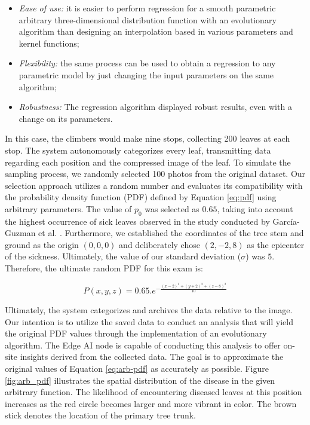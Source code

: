 \begin{itemize}
    \item \textit{Ease of use:} it is easier to perform regression for a smooth parametric arbitrary three-dimensional distribution function with an evolutionary algorithm than designing an interpolation based in various parameters and kernel functions;
    \item \textit{Flexibility:} the same process can be used to obtain a regression to any parametric model by just changing the input parameters on the same algorithm;
    \item \textit{Robustness:} The regression algorithm displayed robust results, even with a change on its parameters.
\end{itemize}

In this case, the climbers would make nine stops, collecting 200 leaves at each stop. The system autonomously categorizes every leaf, transmitting data regarding each position and the compressed image of the leaf. To simulate the sampling process, we randomly selected 100 photos from the original dataset. Our selection approach utilizes a random number and evaluates its compatibility with the probability density function (PDF) defined by Equation \ref{eq:pdf} using arbitrary parameters. The value of $p_0$ was selected as $0.65$, taking into account the highest occurrence of sick leaves observed in the study conducted by García-Guzman et al. \cite{garcia2004incidence}. Furthermore, we established the coordinates of the tree stem and ground as the origin $(0,0,0)$ and deliberately chose $(2,-2,8)$ as the epicenter of the sickness. Ultimately, the value of our standard deviation ($\sigma$) was $5$. Therefore, the ultimate random PDF for this exam is:

\begin{equation}
\label{eq:arb-pdf}
    P(x,y,z) = 0.65 . e^{-\frac{(x-2)^2 + (y+2)^2 + (z-8)^2}{10}}
\end{equation}

Ultimately, the system categorizes and archives the data relative to the image. Our intention is to utilize the saved data to conduct an analysis that will yield the original PDF values through the implementation of an evolutionary algorithm. The Edge AI node is capable of conducting this analysis to offer on-site insights derived from the collected data. The goal is to approximate the original values of Equation \ref{eq:arb-pdf} as accurately as possible. Figure \ref{fig:arb_pdf} illustrates the spatial distribution of the disease in the given arbitrary function. The likelihood of encountering diseased leaves at this position increases as the red circle becomes larger and more vibrant in color. The brown stick denotes the location of the primary tree trunk.

